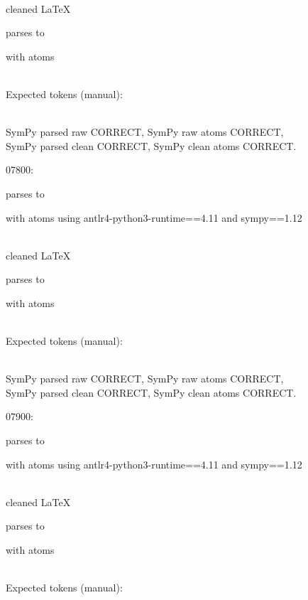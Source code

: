 \documentclass{article}
\begin{document}
\ \\
cleaned \LaTeX

parses to

with atoms


\ \\
Expected tokens (manual):


\ \\
SymPy parsed raw CORRECT, 
SymPy raw atoms CORRECT, \\
SymPy parsed clean CORRECT, 
SymPy clean atoms CORRECT.

\hrulefill

07800:

parses to

with atoms
using antlr4-python3-runtime==4.11 and sympy==1.12

\ \\
cleaned \LaTeX

parses to

with atoms


\ \\
Expected tokens (manual):


\ \\
SymPy parsed raw CORRECT, 
SymPy raw atoms CORRECT, \\
SymPy parsed clean CORRECT, 
SymPy clean atoms CORRECT.

\hrulefill

07900:

parses to

with atoms
using antlr4-python3-runtime==4.11 and sympy==1.12

\ \\
cleaned \LaTeX

parses to

with atoms


\ \\
Expected tokens (manual):

\end{document}
